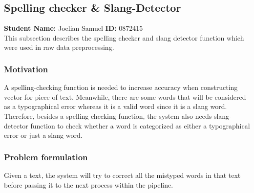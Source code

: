 \subsection{Spelling checker \& Slang-Detector}
\textbf{Student Name: }Joelian Samuel \textbf{ ID:} 0872415\\
This subsection describes the spelling checker and slang detector function which were used in raw data preprocessing.
\subsubsection*{Motivation}
A spelling-checking function is needed to increase accuracy when constructing vector for piece of text. Meanwhile, there are some words that will be considered as a typographical error whereas it is a valid word since it is a slang word. Therefore, besides a spelling checking function, the system also needs slang-detector function to check whether a word is categorized as either a typographical error or just a slang word.
\subsubsection*{Problem formulation}
Given a text, the system will try to correct all the mistyped words in that text before passing it to the next process within the pipeline.

